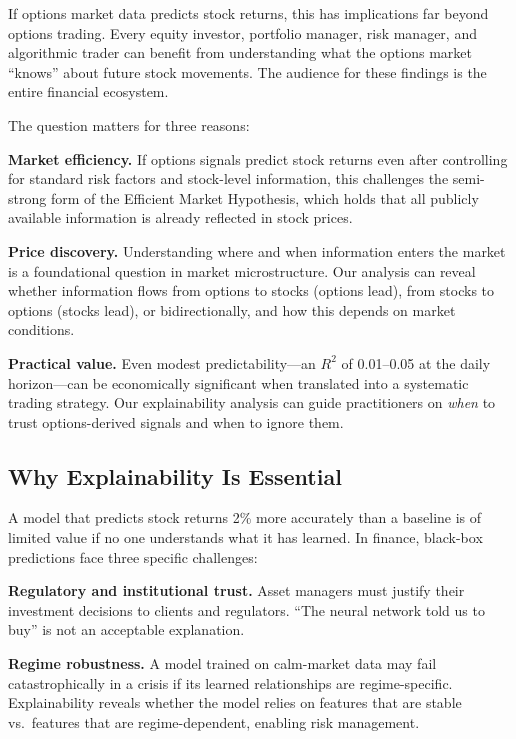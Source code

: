 \documentclass[11pt,a4paper]{article}
\begin{document}
\begin{keyinsight}
If options market data predicts stock returns, this has implications far beyond options trading. Every equity investor, portfolio manager, risk manager, and algorithmic trader can benefit from understanding what the options market ``knows'' about future stock movements. The audience for these findings is the entire financial ecosystem.
\end{keyinsight}

The question matters for three reasons:

\textbf{Market efficiency.} If options signals predict stock returns even after controlling for standard risk factors and stock-level information, this challenges the semi-strong form of the Efficient Market Hypothesis, which holds that all publicly available information is already reflected in stock prices.

\textbf{Price discovery.} Understanding where and when information enters the market is a foundational question in market microstructure. Our analysis can reveal whether information flows from options to stocks (options lead), from stocks to options (stocks lead), or bidirectionally, and how this depends on market conditions.

\textbf{Practical value.} Even modest predictability---an $R^2$ of 0.01--0.05 at the daily horizon---can be economically significant when translated into a systematic trading strategy. Our explainability analysis can guide practitioners on \emph{when} to trust options-derived signals and when to ignore them.

\subsection{Why Explainability Is Essential}

A model that predicts stock returns 2\% more accurately than a baseline is of limited value if no one understands what it has learned. In finance, black-box predictions face three specific challenges:

\textbf{Regulatory and institutional trust.} Asset managers must justify their investment decisions to clients and regulators. ``The neural network told us to buy'' is not an acceptable explanation.

\textbf{Regime robustness.} A model trained on calm-market data may fail catastrophically in a crisis if its learned relationships are regime-specific. Explainability reveals whether the model relies on features that are stable vs.\ features that are regime-dependent, enabling risk management.
\end{document}
